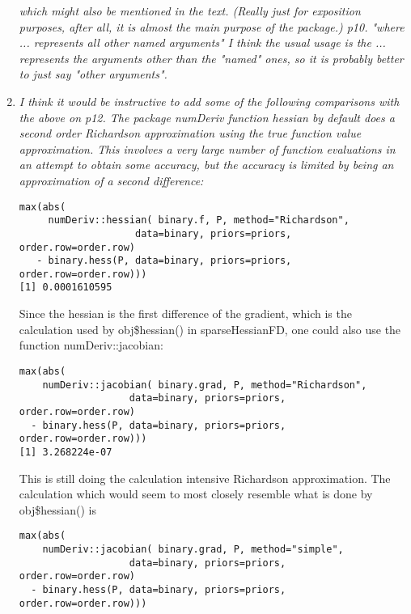 \documentclass{article}
\newenvironment{revQuote}{\itshape}{\vspace{\baselineskip}}
\newenvironment{response}{\normalfont}{\vspace{\baselineskip}}
\begin{document}
\begin{enumerate}
\begin{revQuote}
which might also be mentioned in the text. (Really just for exposition
purposes, after all, it is almost the main purpose of the package.)
p10. "where ... represents all other named arguments"
   I think the usual usage is the ... represents the arguments other than
the "named" ones, so it is probably better to just say "other arguments".
  \end{revQuote}

\begin{response}
  
\end{response}


\item \begin{revQuote}
I think it would be instructive to add some of the following comparisons
with the above on p12.  The package numDeriv function hessian by default
does a second order Richardson approximation using the true function value
approximation. This involves a very large number of function evaluations in
an attempt to obtain some accuracy, but the accuracy is limited by being an
approximation of a second difference:
\begin{verbatim}
max(abs(
     numDeriv::hessian( binary.f, P, method="Richardson", 
                    data=binary, priors=priors,
order.row=order.row) 
   - binary.hess(P, data=binary, priors=priors, order.row=order.row)))
[1] 0.0001610595

\end{verbatim}

Since the hessian is the first difference of the gradient, which is the
calculation used by obj\$hessian() in sparseHessianFD, one could also use the
function numDeriv::jacobian:

\begin{verbatim}
max(abs( 
    numDeriv::jacobian( binary.grad, P, method="Richardson", 
                   data=binary, priors=priors,
order.row=order.row)
  - binary.hess(P, data=binary, priors=priors, order.row=order.row)))
[1] 3.268224e-07
\end{verbatim}

This is still doing the calculation intensive Richardson approximation. The
calculation which would seem to most closely resemble what is done by
obj\$hessian() is

\begin{verbatim}
max(abs( 
    numDeriv::jacobian( binary.grad, P, method="simple", 
                   data=binary, priors=priors,
order.row=order.row)
  - binary.hess(P, data=binary, priors=priors, order.row=order.row)))


\end{verbatim}
\end{revQuote}
\end{enumerate}
\end{document}
